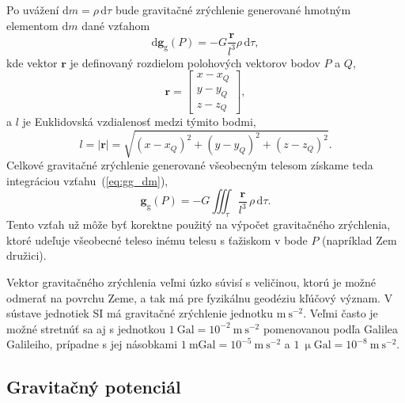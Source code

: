 \documentclass[a4paper, 12pt]{book}
\newcommand{\diff}{\mathrm d}
\newcommand{\gidx}{\mathrm g}
\let\vec\mathbf
\begin{document}
Po uvážení $\diff m = \rho \, \diff \tau$ bude gravitačné zrýchlenie generované 
hmotným elementom $\diff m$ dané vzťahom
%
\begin{equation}
\label{eq:gg_dm}
\diff \vec g_\gidx(P) = -G \frac{\vec r}{l^3} \rho \, \diff\tau{,}
\end{equation}
%
kde vektor $\vec r$ je definovaný rozdielom polohových vektorov bodov $P$ 
a $Q$,
%
\begin{equation}
\label{eq:r}
\vec r = 
%
\begin{bmatrix}
x - x_Q \\
y - y_Q \\
z - z_Q
\end{bmatrix}
{,}
\end{equation}
%
a $l$ je Euklidovská vzdialenosť medzi týmito bodmi,
%
\begin{equation}
\label{eq:l}
l = | \vec r | = \sqrt{(x - x_Q)^2 + (y - y_Q)^2 + (z - z_Q)^2}{.}
\end{equation}
%
Celkové gravitačné zrýchlenie generované všeobecným telesom získame teda 
integráciou vzťahu~(\ref{eq:gg_dm}),
%
\begin{equation}
\label{eq:gg_body}
\vec g_\gidx(P) = -G \iiint_{\tau} \frac{\vec r}{l^3} \, \rho \, \diff\tau{.}
\end{equation}
%
Tento vzťah už môže byť korektne použitý na výpočet gravitačného zrýchlenia, 
ktoré udeľuje všeobecné teleso inému telesu s ťažiskom v bode $P$ (napríklad 
Zem družici).

Vektor gravitačného zrýchlenia veľmi úzko súvisí s veličinou, ktorú je možné 
odmerať na povrchu Zeme, a tak má pre fyzikálnu geodéziu kľúčový význam.  
V sústave jednotiek SI má gravitačné zrýchlenie jednotku $\mathrm{m}\ 
\mathrm{s}^{-2}$.  Veľmi často je možné stretnúť sa aj s jednotkou $1\ 
\mathrm{Gal} = 10^{-2}\ \mathrm{m}\ \mathrm{s}^{-2}$ pomenovanou podľa Galilea 
Galileiho, prípadne s jej násobkami $1\ \mathrm{mGal} = 10^{-5}\ \mathrm{m}\ 
\mathrm{s}^{-2}$ a $1\ \upmu \mathrm{Gal} = 10^{-8}\ \mathrm{m}\ 
\mathrm{s}^{-2}$.






\subsection{Gravitačný potenciál}
\label{sec:vg}
\end{document}
